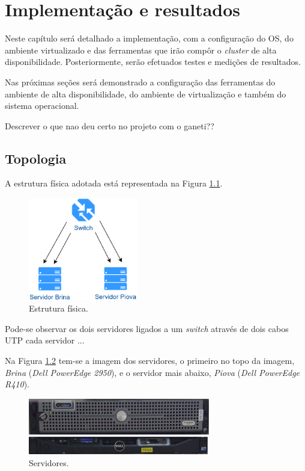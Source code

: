 \chapter{Implementação e resultados}
\label{cap:implementacaoresultados}

Neste capítulo será detalhado a implementação, com a configuração do \ac{OS}, do ambiente virtualizado e das ferramentas que irão compôr o
\textit{cluster} de alta disponibilidade. Posteriormente, serão efetuados testes e medições de resultados.

Nas próximas seções será demonstrado a configuração das ferramentas do ambiente de alta disponibilidade, do ambiente de virtualização e 
também do sistema operacional.

Descrever o que nao deu certo no projeto com o ganeti??

\section{Topologia}

A estrutura física adotada está representada na Figura \ref{fig:projeto_fisico}.

\begin{figure}[h!]
 \centering
 \includegraphics[width=180px]{img/projeto_fisico.eps}
 \caption{Estrutura física.}
 \label{fig:projeto_fisico}
\end{figure}

Pode-se observar os dois servidores ligados a um \textit{switch} através de dois cabos UTP cada servidor ...

Na Figura \ref{fig:servidores_brina_piova} tem-se a imagem dos servidores, o primeiro no topo da imagem, \textit{Brina} 
(\textit{Dell PowerEdge 2950}), e o servidor mais abaixo, \textit{Piova} (\textit{Dell PowerEdge R410}).

\begin{figure}[h!]
 \centering
 \includegraphics[width=300px]{img/servidores_brina_piova.eps}
 \caption{Servidores.}
 \label{fig:servidores_brina_piova}
\end{figure}

